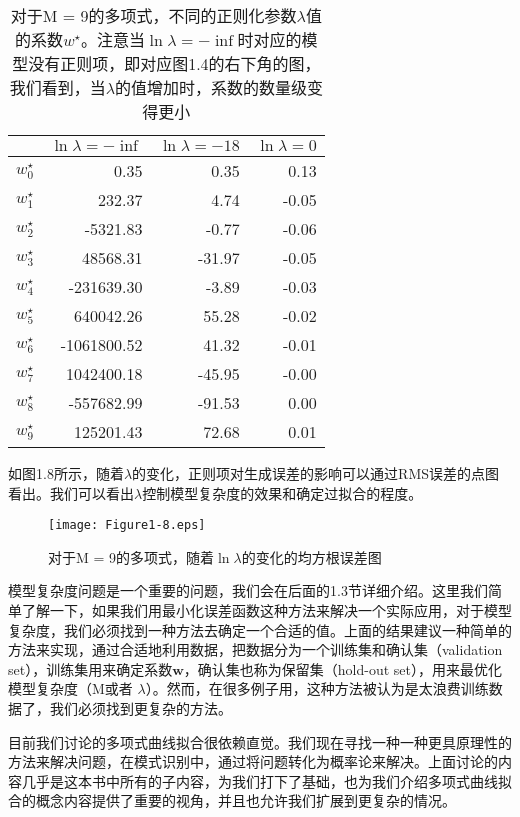 	\begin{table}[b]
		\parbox{.4\textwidth}{\caption{对于M = 9的多项式，不同的正则化参数$\lambda$值的系数$w^{\star}$。注意当$\ln \lambda = -\inf$时对应的模型没有正则项，即对应图1.4的右下角的图，我们看到，当$\lambda$的值增加时，系数的数量级变得更小}}
		\parbox{.5\textwidth}{
			\begin{tabular}{r|rrr}
				& $\ln \lambda = -\inf$ & $\ln \lambda = -18$ & $\ln \lambda = 0$ \\
				\hline
				$w_0^{\star}$ & 0.35 & 0.35 & 0.13\\
				$w_1^{\star}$ & 232.37 & 4.74 & -0.05 \\
				$w_2^{\star}$ & -5321.83 & -0.77 & -0.06 \\
				$w_3^{\star}$ & 48568.31 & -31.97 & -0.05 \\
				$w_4^{\star}$ & -231639.30 & -3.89 & -0.03 \\
				$w_5^{\star}$ & 640042.26 & 55.28 & -0.02\\
				$w_6^{\star}$ & -1061800.52 & 41.32 & -0.01 \\
				$w_7^{\star}$ & 1042400.18 & -45.95 & -0.00 \\
				$w_8^{\star}$ & -557682.99 & -91.53 & 0.00 \\
				$w_9^{\star}$ & 125201.43 & 72.68 & 0.01
			\end{tabular}
		}
	\end{table}
	
	如图1.8所示，随着$\lambda$的变化，正则项对生成误差的影响可以通过RMS误差的点图看出。我们可以看出$\lambda$控制模型复杂度的效果和确定过拟合的程度。
	
	\begin{figure}[t]
		\parbox{.4\textwidth}{\caption{对于M = 9的多项式，随着$\ln \lambda$的变化的均方根误差图}}
		\parbox{.5\textwidth}{\texttt{[image: Figure1-8.eps]}}
	\end{figure}
	
	模型复杂度问题是一个重要的问题，我们会在后面的1.3节详细介绍。这里我们简单了解一下，如果我们用最小化误差函数这种方法来解决一个实际应用，对于模型复杂度，我们必须找到一种方法去确定一个合适的值。上面的结果建议一种简单的方法来实现，通过合适地利用数据，把数据分为一个训练集和确认集（validation set），训练集用来确定系数$\mathbf{w}$，确认集也称为保留集（hold-out set），用来最优化模型复杂度（M或者 $\lambda$）。然而，在很多例子用，这种方法被认为是太浪费训练数据了，我们必须找到更复杂的方法。
	
	目前我们讨论的多项式曲线拟合很依赖直觉。我们现在寻找一种一种更具原理性的方法来解决问题，在模式识别中，通过将问题转化为概率论来解决。上面讨论的内容几乎是这本书中所有的子内容，为我们打下了基础，也为我们介绍多项式曲线拟合的概念内容提供了重要的视角，并且也允许我们扩展到更复杂的情况。
	
